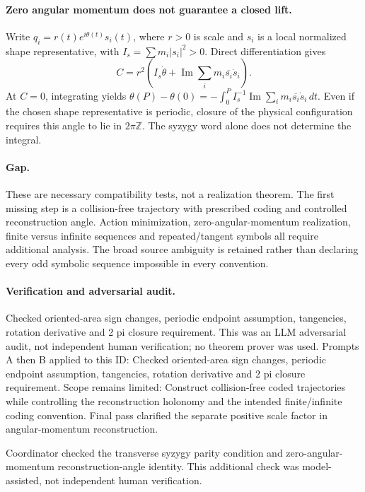 \documentclass[11pt]{article}
\begin{document}
\paragraph{Zero angular momentum does not guarantee a closed lift.}Write \(q_i=r(t)e^{i\theta(t)}s_i(t)\), where \(r>0\) is scale and \(s_i\) is a local normalized shape representative, with \(I_s=\sum m_i|s_i|^2>0\). Direct differentiation gives
\[C=r^2\left(I_s\dot\theta+\operatorname{Im}\sum_i m_i\overline{s_i}\dot s_i\right).
\]
At \(C=0\), integrating yields \(\theta(P)-\theta(0)=-\int_0^P I_s^{-1}\operatorname{Im}\sum_i m_i\overline{s_i}\dot s_i\,dt\). Even if the chosen shape representative is periodic, closure of the physical configuration requires this angle to lie in \(2\pi\mathbb Z\). The syzygy word alone does not determine the integral.
\paragraph{Gap.}These are necessary compatibility tests, not a realization theorem. The first missing step is a collision-free trajectory with prescribed coding and controlled reconstruction angle. Action minimization, zero-angular-momentum realization, finite versus infinite sequences and repeated/tangent symbols all require additional analysis. The broad source ambiguity is retained rather than declaring every odd symbolic sequence impossible in every convention.

\paragraph{Verification and adversarial audit.}
Checked oriented-area sign changes, periodic endpoint assumption, tangencies, rotation derivative and 2 pi closure requirement. This was an LLM adversarial audit, not independent human verification; no theorem prover was used. Prompts A then B applied to this ID: Checked oriented-area sign changes, periodic endpoint assumption, tangencies, rotation derivative and 2 pi closure requirement. Scope remains limited: Construct collision-free coded trajectories while controlling the reconstruction holonomy and the intended finite/infinite coding convention. Final pass clarified the separate positive scale factor in angular-momentum reconstruction.

Coordinator checked the transverse syzygy parity condition and zero-angular-momentum reconstruction-angle identity. This additional check was model-assisted, not independent human verification.
\end{document}
